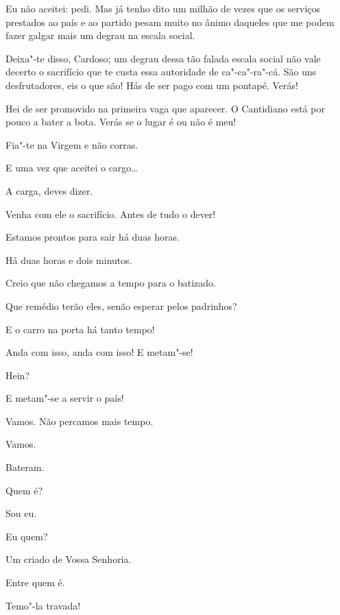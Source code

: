 \begin{linenumbers}
  Eu não aceitei: pedi. Mas já tenho dito
um milhão de vezes que os serviços prestados ao país e ao partido pesam muito no
ânimo daqueles que me podem fazer galgar mais um degrau na
escala social.

 Deixa"-te disso, Cardoso; um degrau dessa tão falada escala social
não vale decerto o sacrifício que te custa essa autoridade de ca"-ca"-ra"-cá. São
uns desfrutadores, eis o que são! Hás de ser pago com um pontapé. Verás!

 Hei de ser promovido na primeira vaga que aparecer. O
Cantidiano está por pouco a bater a bota. Verás se o lugar é ou não é meu!

 Fia"-te na Virgem e não corras.

 E uma vez que aceitei o cargo\ldots{}

 A carga, deves dizer.

 Venha com ele o sacrifício. Antes de tudo o dever!

 Estamos prontos para sair há duas horas.

  Há duas horas e
dois minutos.

  Creio que não chegamos a
tempo para o batizado.

 Que remédio terão eles, senão esperar pelos padrinhos?

 E o carro na porta há tanto tempo!

 Anda com isso, anda com isso! E metam"-se!

 Hein?

 E metam"-se a servir o país!

 Vamos. Não percamos mais tempo.

 Vamos. 

 Bateram.

 Quem é?

  Sou eu.

 Eu quem?

  Um criado de Vossa Senhoria.

 Entre quem é.

 Temo"-la travada! 


\end{linenumbers}
